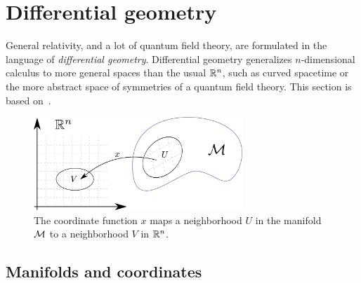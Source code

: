 \section{Differential geometry}
\label{section: differential geometry}


General relativity, and a lot of quantum field theory, are formulated in the language of \emph{differential geometry}.
Differential geometry generalizes $n$-dimensional calculus to more general spaces than the usual $\mathbb{R}^n$, such as curved spacetime or the more abstract space of symmetries of a quantum field theory.
This section is based on~\autocite{carrollSpacetimeGeometryIntroduction2019,leeIntroductionSmoothManifolds2003d}.

\begin{figure}[H]
    \centering
    \includegraphics[width=0.7\textwidth]{figurer/coordinate_function.pdf}
    \caption{
        The coordinate function $x$ maps a neighborhood $U$ in the manifold $\mathcal{M}$ to a neighborhood $V$ in $\mathbb{R}^n$.
        }
    \label{fig: coordinate function}
\end{figure}



\subsection{Manifolds and coordinates}


